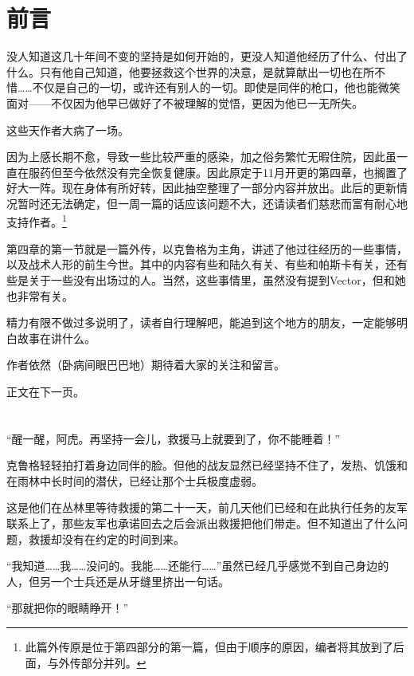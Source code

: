 
\section*{前言}
没人知道这几十年间不变的坚持是如何开始的，更没人知道他经历了什么、付出了什么。只有他自己知道，他要拯救这个世界的决意，是就算献出一切也在所不惜……不仅是自己的一切，或许还有别人的一切。即使是同伴的枪口，他也能微笑面对——不仅因为他早已做好了不被理解的觉悟，更因为他已一无所失。

\lineseparator


这些天作者大病了一场。

因为上感长期不愈，导致一些比较严重的感染，加之俗务繁忙无暇住院，因此虽一直在服药但至今依然没有完全恢复健康。因此原定于11月开更的第四章，也搁置了好大一阵。现在身体有所好转，因此抽空整理了一部分内容并放出。此后的更新情况暂时还无法确定，但一周一篇的话应该问题不大，还请读者们慈悲而富有耐心地支持作者。\footnote{此篇外传原是位于第四部分的第一篇，但由于顺序的原因，编者将其放到了后面，与外传部分并列。}

第四章的第一节就是一篇外传，以克鲁格为主角，讲述了他过往经历的一些事情，以及战术人形的前生今世。其中的内容有些和陆久有关、有些和帕斯卡有关，还有些是关于一些没有出场过的人。当然，这些事情里，虽然没有提到Vector，但和她也非常有关。

精力有限不做过多说明了，读者自行理解吧，能追到这个地方的朋友，一定能够明白故事在讲什么。

作者依然（卧病间眼巴巴地）期待着大家的关注和留言。

正文在下一页。

\section*{}

“醒一醒，阿虎。再坚持一会儿，救援马上就要到了，你不能睡着！”

克鲁格轻轻拍打着身边同伴的脸。但他的战友显然已经坚持不住了，发热、饥饿和在雨林中长时间的潜伏，已经让那个士兵极度虚弱。

这是他们在丛林里等待救援的第二十一天，前几天他们已经和在此执行任务的友军联系上了，那些友军也承诺回去之后会派出救援把他们带走。但不知道出了什么问题，救援却没有在约定的时间到来。

“我知道……我……没问的。我能……还能行……”虽然已经几乎感觉不到自己身边的人，但另一个士兵还是从牙缝里挤出一句话。

“那就把你的眼睛睁开！”

